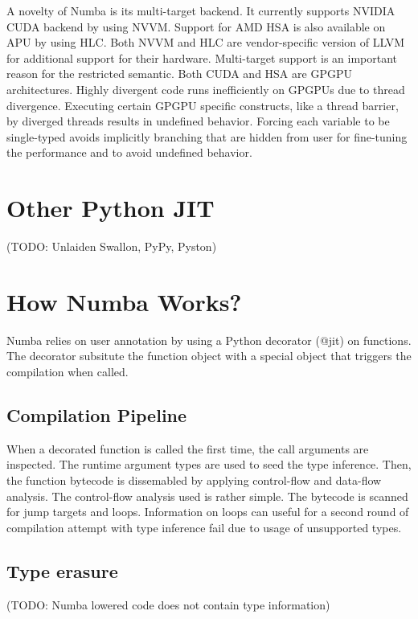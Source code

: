 \documentclass{acm_proc_article-sp}
\begin{document}
A novelty of Numba is its multi-target backend.  It currently supports NVIDIA
CUDA backend by using NVVM.  Support for AMD HSA is also available on APU by
using HLC.  Both NVVM and HLC are vendor-specific version of LLVM for
additional support for their hardware.  Multi-target support is an important
reason for the restricted semantic.  Both CUDA and HSA are GPGPU architectures.
Highly divergent code runs inefficiently on GPGPUs due to thread divergence.
Executing certain GPGPU specific constructs, like a thread barrier, by diverged
threads results in undefined behavior. Forcing each variable to be single-typed
avoids implicitly branching that are hidden from user for fine-tuning the
performance and to avoid undefined behavior.

\section{Other Python JIT}

(TODO: Unlaiden Swallon, PyPy, Pyston)

\section{How Numba Works?}

Numba relies on user annotation by using a Python decorator (@jit) on functions.
The decorator subsitute the function object with a special object that triggers
the compilation when called.

\subsection{Compilation Pipeline}

When a decorated function is called the first time, the call arguments are
inspected. The runtime argument types are used to seed the type inference.
Then, the function bytecode is dissemabled by applying control-flow and
data-flow analysis. The control-flow analysis used is rather simple.
The bytecode is scanned for jump targets and loops. Information on loops
can useful for a second round of compilation attempt with type inference fail
due to usage of unsupported types.




\subsection{Type erasure}

(TODO: Numba lowered code does not contain type information)
\end{document}
